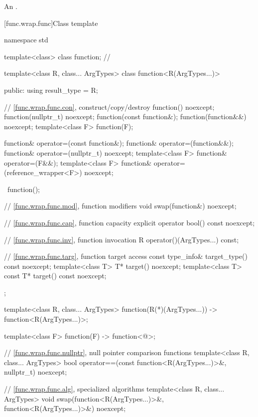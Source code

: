 \begin{itemdescr}
\pnum
\returns
An
 \ntbs{}.
\end{itemdescr}

[func.wrap.func]{Class template }
%

%
\begin{codeblock}
namespace std {
  template<class> class function;       // \notdef

  template<class R, class... ArgTypes>
  class function<R(ArgTypes...)> {
  public:
    using result_type = R;

    // \ref{func.wrap.func.con}, construct/copy/destroy
    function() noexcept;
    function(nullptr_t) noexcept;
    function(const function&);
    function(function&&) noexcept;
    template<class F> function(F);

    function& operator=(const function&);
    function& operator=(function&&);
    function& operator=(nullptr_t) noexcept;
    template<class F> function& operator=(F&&);
    template<class F> function& operator=(reference_wrapper<F>) noexcept;

    ~function();

    // \ref{func.wrap.func.mod}, function modifiers
    void swap(function&) noexcept;

    // \ref{func.wrap.func.cap}, function capacity
    explicit operator bool() const noexcept;

    // \ref{func.wrap.func.inv}, function invocation
    R operator()(ArgTypes...) const;

    // \ref{func.wrap.func.targ}, function target access
    const type_info& target_type() const noexcept;
    template<class T>       T* target() noexcept;
    template<class T> const T* target() const noexcept;
  };

  template<class R, class... ArgTypes>
    function(R(*)(ArgTypes...)) -> function<R(ArgTypes...)>;

  template<class F> function(F) -> function<@\seebelow@>;

  // \ref{func.wrap.func.nullptr}, null pointer comparison functions
  template<class R, class... ArgTypes>
    bool operator==(const function<R(ArgTypes...)>&, nullptr_t) noexcept;

  // \ref{func.wrap.func.alg}, specialized algorithms
  template<class R, class... ArgTypes>
    void swap(function<R(ArgTypes...)>&, function<R(ArgTypes...)>&) noexcept;
}
\end{codeblock}

